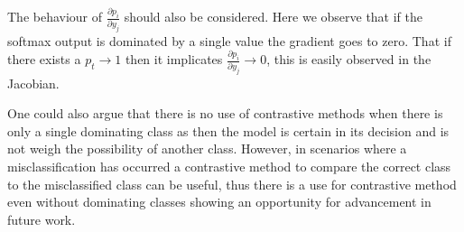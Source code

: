 The behaviour of $\frac{\partial p_i}{\partial y_j}$ should also be considered. Here we observe that if the softmax output is dominated by a single value the gradient goes to zero. That if there exists a $p_t \to 1$ then it implicates $\frac{\partial p_i}{\partial y_j} \to 0$, this is easily observed in the Jacobian. 

One could also argue that there is no use of contrastive methods when there is only a single dominating class as then the model is certain in its decision and is not weigh the possibility of another class. However, in scenarios where a misclassification has occurred a contrastive method to compare the correct class to the misclassified class can be useful, thus there is a use for contrastive method even without dominating classes showing an opportunity for advancement in future work.

